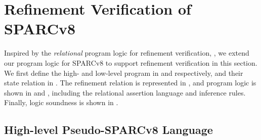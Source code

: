\section{Refinement Verification of SPARCv8}
\label{sec:refine-verification-sparc}

Inspired by the {\it relational} program logic for 
refinement verification, , 
we extend our program logic for SPARCv8 to support
refinement verification in this section. 
We first define the high- and low-level program in 
\Sec{\ref{subsec:High-level Pseudo-SPARCv8 Language}} and 
\Sec{\ref{subsec:low-level SPARCv8 Program}} respectively, 
and their state relation in \Sec{\ref{subsec:state-rel}}. 
The refinement relation is represented in 
\Sec{\ref{subsec:correctness-primitive}}, 
and program logic is shown in 
\Sec{\ref{subsec:rel-assertion}} and 
\Sec{\ref{subsec:logic-rule-refinemet}}, 
including the relational assertion language 
and inference rules.  
Finally, logic soundness is shown in 
\Sec{\ref{subsec:logic-ensuring-ctxrefinement}}.

\subsection{High-level Pseudo-SPARCv8 Language}
\label{subsec:High-level Pseudo-SPARCv8 Language}


